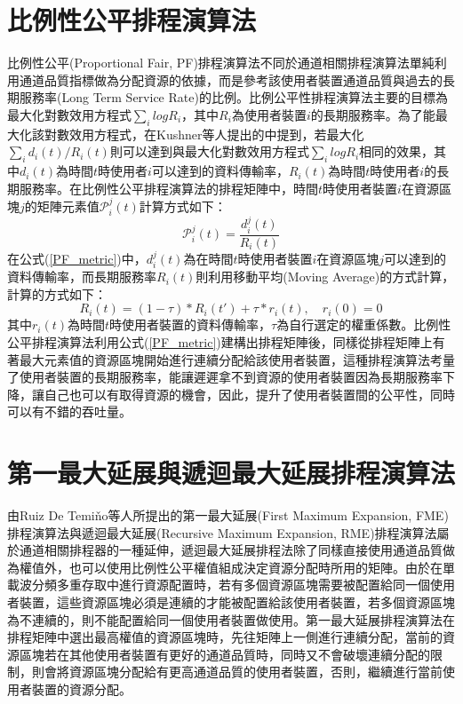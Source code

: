 \section{比例性公平排程演算法}
比例性公平(Proportional Fair, PF)排程演算法\cite{kush2002}不同於通道相關排程演算法單純利用通道品質指標做為分配資源的依據，而是參考該使用者裝置通道品質與過去的長期服務率(Long Term Service Rate)的比例。比例公平性排程演算法主要的目標為最大化對數效用方程式$\sum_ilogR_i$，其中$R_i$為使用者裝置$i$的長期服務率。為了能最大化該對數效用方程式，在Kushner等人提出的\cite{kush2002}中提到，若最大化$\sum_id_i(t)/R_i(t)$則可以達到與最大化對數效用方程式$\sum_ilogR_i$相同的效果，其中$d_i(t)$為時間$t$時使用者$i$可以達到的資料傳輸率，$R_i(t)$為時間$t$時使用者$i$的長期服務率。在比例性公平排程演算法的排程矩陣中，時間$t$時使用者裝置$i$在資源區塊$j$的矩陣元素值$\mathcal{P}_i^j(t)$計算方式如下：
\begin{equation}
\label{PF_metric}
\mathcal{P}_i^j(t)=\dfrac{d_i^j(t)}{R_i(t)}
\end{equation}
在公式(\ref{PF_metric})中，$d_i^j(t)$為在時間$t$時使用者裝置$i$在資源區塊$j$可以達到的資料傳輸率，而長期服務率$R_i(t)$則利用移動平均(Moving Average)的方式計算，計算的方式如下：
\begin{equation}
\label{Moving_average}
R_i(t)=(1-\tau)*R_i(t')+\tau*r_i(t),\quad r_i(0)=0
\end{equation}
其中$r_i(t)$為時間$t$時使用者裝置的資料傳輸率，$\tau$為自行選定的權重係數。比例性公平排程演算法利用公式(\ref{PF_metric})建構出排程矩陣後，同樣從排程矩陣上有著最大元素值的資源區塊開始進行連續分配給該使用者裝置，這種排程演算法考量了使用者裝置的長期服務率，能讓遲遲拿不到資源的使用者裝置因為長期服務率下降，讓自己也可以有取得資源的機會，因此，提升了使用者裝置間的公平性，同時可以有不錯的吞吐量。
\clearpage
\section{第一最大延展與遞迴最大延展排程演算法}
由Ruiz De Temi{\v{n}}o等人所提出的第一最大延展(First Maximum Expansion, FME)排程演算法\cite{fmerme2008}與遞迴最大延展(Recursive Maximum Expansion, RME)排程演算法\cite{safa2012}屬於通道相關排程器的一種延伸，遞迴最大延展排程法除了同樣直接使用通道品質做為權值外，也可以使用比例性公平權值組成決定資源分配時所用的矩陣。由於在單載波分頻多重存取中進行資源配置時，若有多個資源區塊需要被配置給同一個使用者裝置，這些資源區塊必須是連續的才能被配置給該使用者裝置，若多個資源區塊為不連續的，則不能配置給同一個使用者裝置做使用。第一最大延展排程演算法在排程矩陣中選出最高權值的資源區塊時，先往矩陣上一側進行連續分配，當前的資源區塊若在其他使用者裝置有更好的通道品質時，同時又不會破壞連續分配的限制，則會將資源區塊分配給有更高通道品質的使用者裝置，否則，繼續進行當前使用者裝置的資源分配。

